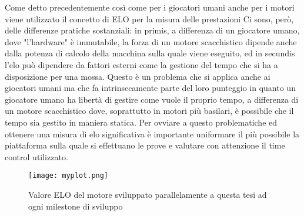 Come detto precedentemente così come per i giocatori umani anche per i motori viene utilizzato il concetto di ELO per la misura delle prestazioni Ci sono, però, delle differenze pratiche sostanziali: in primis,
a differenza di un giocatore umano, dove "l'hardware" è immutabile, la forza di un motore scacchistico dipende anche dalla potenza di calcolo della macchina sulla quale viene eseguito, ed in secundis l'elo può dipendere 
da fattori esterni come la gestione del tempo che si ha a disposizione per una mossa. Questo è un problema che si applica anche ai giocatori umani ma che fa intrinsecamente parte del loro punteggio in quanto 
un giocatore umano ha libertà di gestire come vuole il proprio tempo, a differenza di un motore scacchistico dove, soprattutto in motori più basilari, è possibile che il tempo sia gestito in maniera statica.
Per ovviare a questo problematiche ed ottenere una misura di elo significativa è importante uniformare il più possibile la piattaforma sulla quale si effettuano le prove e valutare con attenzione il time control utilizzato.

\begin{figure}[h]
    \centering
    \texttt{[image: myplot.png]}
    \caption{Valore ELO del motore sviluppato parallelamente a questa tesi ad ogni milestone di sviluppo}
\end{figure}

